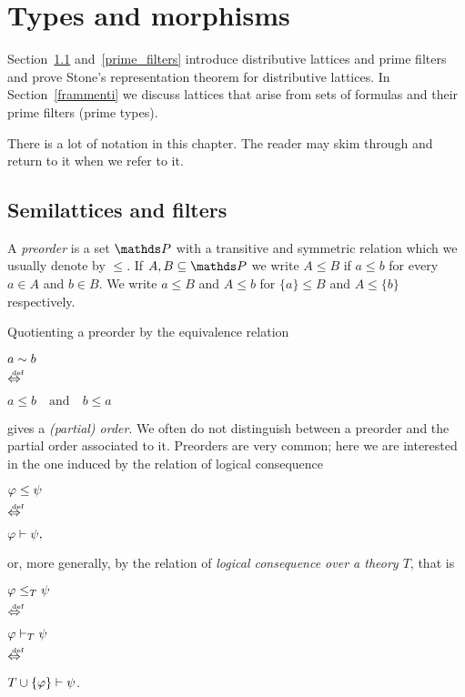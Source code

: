 \documentclass[creche.tex]{subfiles}
\begin{document}
\chapter{Types and morphisms}
\label{types}

\def\ceq#1#2#3{\parbox[b]{20ex}{$\displaystyle #1$}\parbox[b]{6ex}{\hfil$#2$}$\displaystyle #3$}

Section~\ref{reticoli} and~\ref{prime_filters} introduce distributive lattices and prime filters and prove Stone's representation theorem for distributive lattices. 
In Section~\ref{frammenti} we discuss lattices that arise from sets of formulas and their prime filters (prime types). %

There is a lot of notation in this chapter. The reader may skim through and return to it when we refer to it.


\section{Semilattices and filters}\label{reticoli}
\label{stone}

A \emph{preorder\/} is a set $\PP$ with a transitive and symmetric relation which we usually denote by $\le$. If $A,B\subseteq\PP$ we write $A\le B$ if $a\le b$ for every $a\in A$ and $b\in B$. We write $a\le B$ and $A\le b$ for $\{a\}\le B$ and  $A\le \{b\}$ respectively. 

Quotienting a preorder by the equivalence relation 

\ceq{\hfill a\sim b}{\dIFF}{a\le b\quad\textrm{and}\quad b\le a}

gives a \emph{(partial) order}. We often do not distinguish between a preorder and the partial order associated to it. Preorders are very common; here we are interested in the one induced by the relation of logical consequence

\ceq{\hfill \phi\le\psi}{\dIFF}{\phi\proves\psi,}

or, more generally, by the relation of \emph{logical consequence over a theory $T$}, that is

\ceq{\hfill \phi\le_T\psi}{\dIFF}{\phi\proves_T\psi}\parbox{6ex}{\hfil$\dIFF$}$T\cup\{\varphi\}\vdash\psi$.
\end{document}
